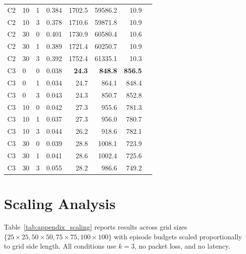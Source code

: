 \documentclass[pdflatex,sn-mathphys-num]{sn-jnl}%
\theoremstyle{thmstyleone}%
\theoremstyle{thmstyletwo}%
\theoremstyle{thmstylethree}%
\begin{document}
\begin{appendices}
\begin{table}
\begin{tabular}{llrrrrrr}
C2 & 10 & 1 & 0.384 & 1702.5 & 59586.2 & 10.9 \\
C2 & 10 & 3 & 0.378 & 1710.6 & 59871.8 & 10.9 \\
C2 & 30 & 0 & 0.401 & 1730.9 & 60580.4 & 10.6 \\
C2 & 30 & 1 & 0.389 & 1721.4 & 60250.7 & 10.9 \\
C2 & 30 & 3 & 0.392 & 1752.4 & 61335.1 & 10.3 \\
\addlinespace[4pt]
C3 & 0 & 0 & 0.038 & \textbf{24.3} & \textbf{848.8} & \textbf{856.5} \\
C3 & 0 & 1 & 0.034 & 24.7 & 864.1 & 848.4 \\
C3 & 0 & 3 & 0.043 & 24.3 & 850.7 & 852.8 \\
C3 & 10 & 0 & 0.042 & 27.3 & 955.6 & 781.3 \\
C3 & 10 & 1 & 0.037 & 27.3 & 956.0 & 780.7 \\
C3 & 10 & 3 & 0.044 & 26.2 & 918.6 & 782.1 \\
C3 & 30 & 0 & 0.039 & 28.8 & 1008.1 & 723.9 \\
C3 & 30 & 1 & 0.041 & 28.6 & 1002.4 & 725.6 \\
C3 & 30 & 3 & 0.055 & 28.2 & 986.6 & 749.2 \\
\bottomrule
\end{tabular}
\end{table}

\section{Scaling Analysis}
Table~\ref{tab:appendix_scaling} reports results across grid sizes $\{25\times25, 50\times50, 75\times75, 100\times100\}$ with episode budgets scaled proportionally to grid side length. All conditions use $k=3$, no packet loss, and no latency.


\end{appendices}
\end{document}
